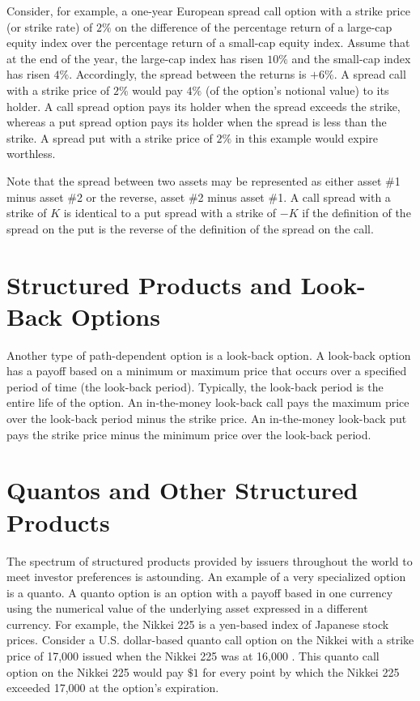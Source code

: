 \documentclass[11pt]{article}
\begin{document}
Consider, for example, a one-year European spread call option with a strike price (or strike rate) of $2 \%$ on the difference of the percentage return of a large-cap equity index over the percentage return of a small-cap equity index. Assume that at the end of the year, the large-cap index has risen $10 \%$ and the small-cap index has risen $4 \%$. Accordingly, the spread between the returns is $+6 \%$. A spread call with a strike price of $2 \%$ would pay $4 \%$ (of the option's notional value) to its holder. A call spread option pays its holder when the spread exceeds the strike, whereas a put spread option pays its holder when the spread is less than the strike. A spread put with a strike price of $2 \%$ in this example would expire worthless.

Note that the spread between two assets may be represented as either asset \#1 minus asset \#2 or the reverse, asset \#2 minus asset \#1. A call spread with a strike of $K$ is identical to a put spread with a strike of $-K$ if the definition of the spread on the put is the reverse of the definition of the spread on the call.

\section*{Structured Products and Look-Back Options}
Another type of path-dependent option is a look-back option. A look-back option has a payoff based on a minimum or maximum price that occurs over a specified period of time (the look-back period). Typically, the look-back period is the entire life of the option. An in-the-money look-back call pays the maximum price over the look-back period minus the strike price. An in-the-money look-back put pays the strike price minus the minimum price over the look-back period.

\section*{Quantos and Other Structured Products}
The spectrum of structured products provided by issuers throughout the world to meet investor preferences is astounding. An example of a very specialized option is a quanto. A quanto option is an option with a payoff based in one currency using the numerical value of the underlying asset expressed in a different currency. For example, the Nikkei 225 is a yen-based index of Japanese stock prices. Consider a U.S. dollar-based quanto call option on the Nikkei with a strike price of 17,000 issued when the Nikkei 225 was at 16,000 . This quanto call option on the Nikkei 225 would pay $\$ 1$ for every point by which the Nikkei 225 exceeded 17,000 at the option's expiration.
\end{document}

